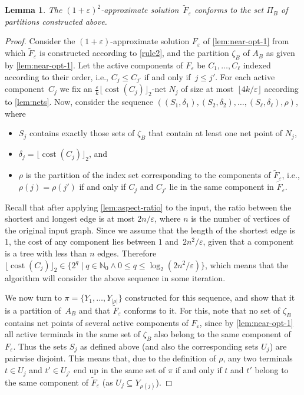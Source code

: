 \documentclass[a4paper]{article}
\theoremstyle{plain}
\newtheorem{lemma}[theorem]{Lemma}%
\newcommand{\eps}{{\varepsilon}}
\DeclareMathOperator{\cost}{cost}
\newcommand{\pow}[1]{\lfloor #1\rfloor_{2}}
\begin{document}
\begin{lemma}
The $(1+\eps)^2$-approximate solution~$\widetilde{F}_\eps$ conforms to the set $\Pi_B$ of partitions constructed above.
\end{lemma}
\begin{proof}
Consider the $(1+\eps)$-approximate solution $F_\eps$ of \autoref{lem:near-opt-1} from which $\widetilde{F}_\eps$ is constructed 
according to \autoref{rule2}, and the partition $\zeta_B$ of $A_B$ as given by \autoref{lem:near-opt-1}. Let the active components of 
$F_\eps$ be $C_1,\ldots,C_\ell$ indexed according to their order, i.e., $C_j\leq C_{j'}$ if and only if~$j\leq  j'$.
For each active component~$C_j$ we fix an $\frac{\eps}{k}\pow{\cost(C_j)}$-net $N_j$ of size at most~$\lfloor 4k/\eps\rfloor$
according to \autoref{lem:nets}. Now, consider the sequence $((S_1,\delta_1),(S_2,\delta_2),\ldots,(S_\ell,\delta_\ell),\rho)$, where
\begin{itemize}
    \item $S_j$ contains exactly those sets of $\zeta_B$ that contain at least one net point of $N_j$,
    \item $\delta_j=\pow{\cost(C_j)}$, and
    \item $\rho$ is the partition of the index set corresponding to the components of $\widetilde{F}_\eps$, i.e., $\rho(j)=\rho(j')$ if and only if $C_j$ and $C_{j'}$ lie in the same component in $\widetilde{F}_\eps$.
\end{itemize}

Recall that after applying \autoref{lem:aspect-ratio} to the input, the ratio between the shortest and longest edge 
is at most $2n/\eps$, where $n$ is the number of vertices of the original input graph.
Since we assume that the length of the shortest edge is $1$, the cost of any component lies between $1$ and~$2n^2/\eps$, 
given that a component is a tree with less than $n$ edges. Therefore $\pow{\cost(C_j)}\in\{2^q\mid q\in\mathbb{N}_0\land 0\leq q\leq \log_2(2n^2/\eps)\}$, which means that the algorithm will consider the above sequence in some iteration.

We now turn to $\pi=\{Y_1,\ldots,Y_{|\rho|}\}$ constructed for this sequence, and show that it is a partition of~$A_B$ and that $\widetilde{F}_\eps$ conforms to it.
For this, note that no set of $\zeta_B$ contains net points of several active components of $F_\eps$,
since by \autoref{lem:near-opt-1} all active terminals in the same set of $\zeta_B$ also belong to the same component of $F_\eps$.
Thus the sets $S_j$ as defined above (and also the corresponding sets $U_j$) are pairwise disjoint. 
This means that, due to the definition of $\rho$, any two terminals $t\in U_j$ and $t'\in U_{j'}$ end up in the same set
of $\pi$ if and only if $t$ and $t'$ belong to the same component of $\widetilde{F}_\eps$ (as $U_j\subseteq Y_{\rho(j)}$).


\end{proof}
\end{document}
